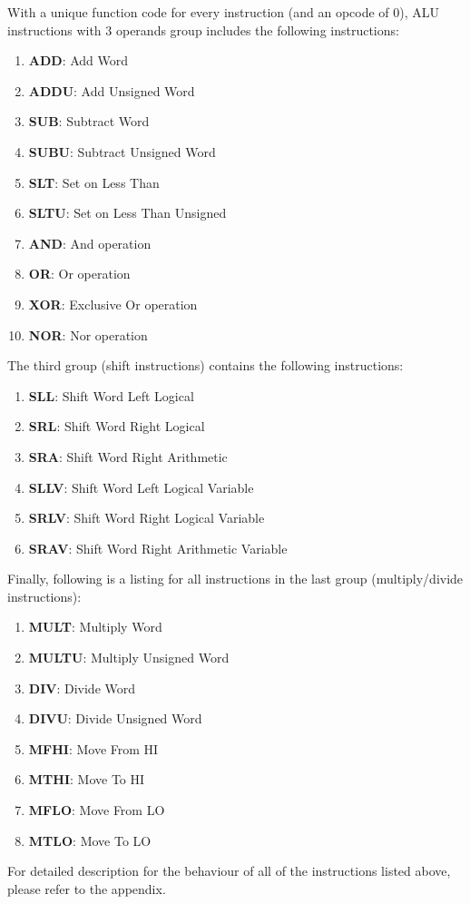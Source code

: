 \documentclass[]{scrartcl}
\begin{document}
\begin{itemize}
With a unique function code for every instruction (and an opcode of 0),
ALU instructions with 3 operands group includes the following instructions:

\begin{enumerate}

\item \textbf{ADD}:  Add Word
\item \textbf{ADDU}: Add Unsigned Word
\item \textbf{SUB}:  Subtract Word
\item \textbf{SUBU}: Subtract Unsigned Word
\item \textbf{SLT}:  Set on Less Than
\item \textbf{SLTU}: Set on Less Than Unsigned
\item \textbf{AND}:  And operation
\item \textbf{OR}:   Or operation
\item \textbf{XOR}:  Exclusive Or operation
\item \textbf{NOR}:  Nor operation

\end{enumerate}

The third group (shift instructions) contains the following instructions:

\begin{enumerate}

\item \textbf{SLL}:  Shift Word Left Logical
\item \textbf{SRL}:  Shift Word Right Logical
\item \textbf{SRA}:  Shift Word Right Arithmetic
\item \textbf{SLLV}: Shift Word Left Logical Variable
\item \textbf{SRLV}: Shift Word Right Logical Variable
\item \textbf{SRAV}: Shift Word Right Arithmetic Variable

\end{enumerate}

Finally, following is a listing for all instructions in the last
group (multiply/divide instructions):

\begin{enumerate}

\item \textbf{MULT}:  Multiply Word
\item \textbf{MULTU}: Multiply Unsigned Word
\item \textbf{DIV}:   Divide Word
\item \textbf{DIVU}:  Divide Unsigned Word
\item \textbf{MFHI}:  Move From HI
\item \textbf{MTHI}:  Move To HI
\item \textbf{MFLO}:  Move From LO
\item \textbf{MTLO}:  Move To LO

\end{enumerate}

For detailed description for the behaviour of all of the instructions listed
above, please refer to the appendix.

\end{itemize}
\end{document}
